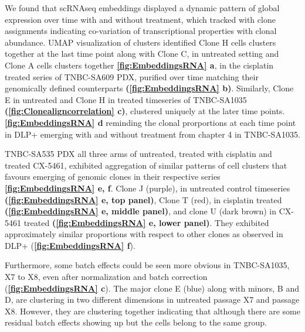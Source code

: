  We found that scRNAseq embeddings displayed a dynamic pattern of global expression over time with and without treatment, which tracked with clone assignments indicating co-variation of transcriptional properties with clonal abundance. UMAP visualization of clusters identified Clone H cells clusters together at the last time point along with Clone C, in untreated setting and Clone A cells clusters together \textbf{\autoref{fig:EmbeddingsRNA} a}, in the cisplatin treated series of TNBC-SA609 PDX, purified over time matching their genomically defined counterparts \textbf{(\autoref{fig:EmbeddingsRNA} b)}. Similarly, Clone E in untreated and Clone H in treated timeseries of TNBC-SA1035  \textbf{(\autoref{fig:Clonealigncorrelation} c)}, clustered uniquely at the later time points. \textbf{\autoref{fig:EmbeddingsRNA} d} reminding the clonal prorportions at each time point in DLP+ emerging with and without treatment from chapter 4 in TNBC-SA1035. 

TNBC-SA535 PDX all three arms of untreated, treated with cisplatin and treated CX-5461, exhibited aggregation of similar patterns of cell clusters that favours emerging of genomic clones in their respective series \textbf{\autoref{fig:EmbeddingsRNA} e, f}. Clone J (purple), in untreated control timeseries \textbf{(\autoref{fig:EmbeddingsRNA} e, top panel)}, Clone T (red), in cisplatin treated \textbf{(\autoref{fig:EmbeddingsRNA} e, middle panel)}, and clone U (dark brown) in CX-5461 treated \textbf{(\autoref{fig:EmbeddingsRNA} e, lower panel)}. They exhibited approximately similar proportions with respect to other clones as observed in DLP+ (\textbf{\autoref{fig:EmbeddingsRNA} f}). 

Furthermore, some batch effects could be seen more obvious in TNBC-SA1035, X7 to X8, even after normalization and batch correction (\textbf{\autoref{fig:EmbeddingsRNA} c}). The major clone E (blue) along with minors, B and D, are clustering in two different dimensions in untreated passage X7 and passage X8. However, they are clustering together indicating that although there are some residual batch effects showing up but the cells belong to the same group.



